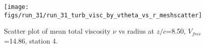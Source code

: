 \begin{figure}[H]
\centering
\texttt{[image: figs/run\_31/run\_31\_turb\_visc\_by\_vtheta\_vs\_r\_meshscatter]}
\caption{Scatter plot of mean total viscosity $\nu$ vs radius at $z/c$=8.50, $V_{free}$=14.86, station 4.}
\label{fig:run_31_turb_visc_by_vtheta_vs_r_meshscatter}
\end{figure}


